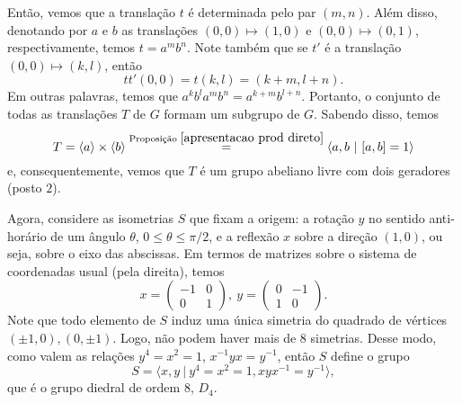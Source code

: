     	\par\vspace{0.3cm} Então, vemos que a translação $t$ é determinada pelo par $(m,n)$. Além disso, 
    	denotando por $a$ e $b$ as translações $(0,0)\mapsto (1,0)$ e $(0,0)\mapsto(0,1)$, respectivamente, 
    	temos $t = a^mb^n$. Note também que se $t'$ é a translação $(0,0)\mapsto(k,l)$, então 
    	\begin{equation*}
    	    tt'(0,0) = t(k,l) = (k+m, l+n).
    	\end{equation*}
    	Em outras palavras, temos que $a^kb^la^mb^n = a^{k+m}b^{l+n}$. Portanto, o 
    	conjunto de todas as translações $T$ de $G$ formam um subgrupo de $G$. Sabendo disso, temos
    	\begin{equation*}
    	    T = \langle a \rangle \times \langle b \rangle \stackrel{\text{Proposição }
    	    \ref{apresentacao prod direto}}{=} \langle a,b \ | \ [a,b]=1 \rangle 
    	\end{equation*} 
    	e, consequentemente, vemos que $T$ é um grupo abeliano livre com dois geradores 
    	(posto $2$).
    	
    	\par\vspace{0.3cm} Agora, considere as isometrias $S$ que fixam a origem: a rotação $y$ no 
    	sentido anti-horário de um ângulo $\theta$, $0\leq \theta\leq \pi/2$, e a reflexão $x$ sobre a 
    	direção $(1,0)$, ou seja, sobre o eixo das abscissas. Em termos de matrizes sobre o sistema de 
    	coordenadas usual (pela direita), temos
    	\begin{equation*}
        	x = \begin{pmatrix}
        	-1 & 0 \\
        	0 & 1
        	\end{pmatrix}, \ 
        	y = \begin{pmatrix}
        	0 & -1 \\
        	1 & 0 
        	\end{pmatrix}.
    	\end{equation*} 
    	Note que todo elemento de $S$ induz uma única simetria do quadrado de 
    	vértices $(\pm1, 0), (0,\pm1)$. Logo, não podem haver mais de $8$ simetrias. Desse modo, como 
    	valem as relações $y^4=x^2=1$, $x^{-1}yx = y^{-1}$, então $S$ define o grupo
    	\begin{equation*}
    	    S = \langle x,y \ | \ y^4=x^2=1, xyx^{-1}=y^{-1} \rangle,
    	\end{equation*} 
    	que é o grupo diedral de ordem $8$, $D_4$.
    	

